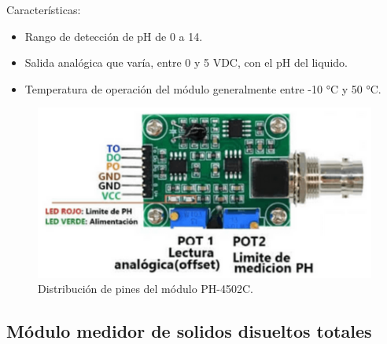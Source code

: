 Características:

\begin{itemize}
	\item Rango de detección de pH de 0 a 14.
	\item Salida analógica que varía, entre 0 y 5 VDC, con el pH del liquido.
	\item Temperatura de operación del módulo generalmente entre -10 °C y 50 °C.
\end{itemize}

\begin{figure}[h]
\centering
\includegraphics[scale=.5]{./Figures/ph.png}
	\caption{Distribución de pines del módulo PH-4502C\protect\footnotemark.}
	\label{fig:ph}
\end{figure}





\subsection{Módulo medidor de solidos disueltos totales}

